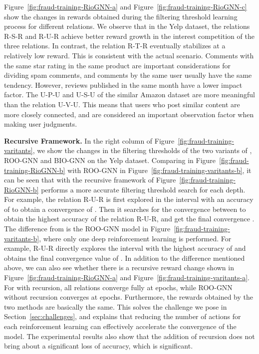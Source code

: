 Figure~\ref{fig:fraud-training-RioGNN-a} and Figure~\ref{fig:fraud-training-RioGNN-c} show the changes in rewards obtained during the filtering threshold learning process for different relations.
We observe that in the Yelp dataset, the relations R-S-R and R-U-R achieve better reward growth in the interest competition of the three relations. 
In contrast, the relation R-T-R eventually stabilizes at a relatively low reward. 
This is consistent with the actual scenario. 
Comments with the same star rating in the same product are important considerations for dividing spam comments, and comments by the same user usually have the same tendency. 
However, reviews published in the same month have a lower impact factor. 
The U-P-U and U-S-U of the similar Amazon dataset are more meaningful than the relation U-V-U. 
This means that users who post similar content are more closely connected, and are considered an important observation factor when making user judgments.



\textbf{Recursive Framework.}
In the right column of Figure~\ref{fig:fraud-training-varitants}, we show the changes in the filtering thresholds of the two variants of \RSRL, ROO-GNN and BIO-GNN on the Yelp dataset.
Comparing \RioGNN in Figure~\ref{fig:fraud-training-RioGNN-b} with ROO-GNN in Figure~\ref{fig:fraud-training-varitants-b}, it can be seen that \RioGNN with the recursive framework of Figure~\ref{fig:fraud-training-RioGNN-b} performs a more accurate filtering threshold search for each depth.
For example, the relation R-U-R is first explored in the interval  with an accuracy of  to obtain a convergence of .
Then it searches for the convergence between  to obtain the highest accuracy  of the relation R-U-R, and get the final convergence . 
The difference from \RioGNN is the ROO-GNN model in Figure~\ref{fig:fraud-training-varitants-b}, where only one deep reinforcement learning is performed.
For example, R-U-R directly explores the  interval with the highest accuracy of  and obtains the final convergence value of .
In addition to the difference mentioned above, we can also see whether there is a recursive reward change shown in Figure~\ref{fig:fraud-training-RioGNN-a} and Figure~\ref{fig:fraud-training-varitants-a}.
For \RioGNN with recursion, all relations converge fully at  epochs, while ROO-GNN without recursion converges at  epochs.
Furthermore, the rewards obtained by the two methods are basically the same.
This solves the challenge we pose in Section~\ref{sec:challenges}, and explains that reducing the number of actions for each reinforcement learning can effectively accelerate the convergence of the model.
The experimental results also show that the addition of recursion does not bring about a significant loss of accuracy, which is significant.

